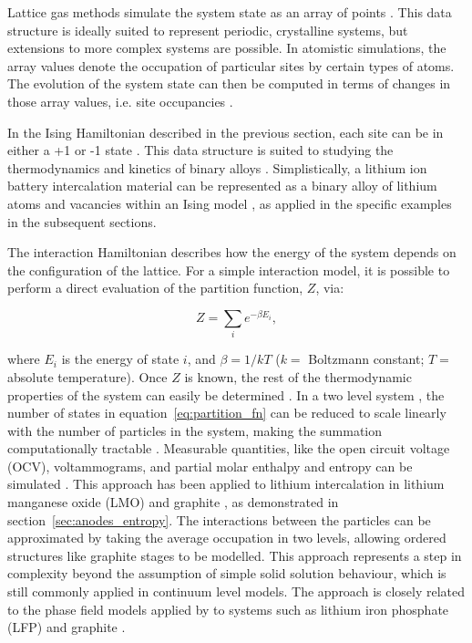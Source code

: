 \documentclass[../main.tex]{subfiles}
\begin{document}
Lattice gas methods simulate the system state as an array of points \cite{Binder2009book}. This data structure is ideally suited to represent periodic, crystalline systems, but extensions to more complex systems are possible. In atomistic simulations, the array values denote the occupation of particular sites by certain types of atoms. The evolution of the system state can then be computed in terms of changes in those array values, i.e. site occupancies \cite{Binder2009book}.
    
In the Ising Hamiltonian described in the previous section, each site can be in either a +1 or -1 state \cite{lee1952}. This data structure is suited to studying the thermodynamics and kinetics of binary alloys \cite{PMERCER2016394,oviedo2015underpotential}. Simplistically, a lithium ion battery intercalation material can be represented as a binary alloy of lithium atoms and vacancies within an Ising model \cite{persson2010,mercer_influence_2017,Kim2001ThermodynamicAK}, as applied in the specific examples in the subsequent sections.  
    
The interaction Hamiltonian describes how the energy of the system depends on the configuration of the lattice. For a simple interaction model, it is possible to perform a direct evaluation of the partition function, $Z$, via:
    
\begin{equation}
        Z = \sum_{i}e^{-\beta E_{i}},
        \label{eq:partition_fn}
\end{equation}

where $E_{i}$ is the energy of state $i$, and $\beta = 1/kT$ ($k =$ Boltzmann constant; $T=$ absolute temperature). Once $Z$ is known, the rest of the thermodynamic properties of the system can easily be determined \cite{Mercer2019,Leiva2017b,schlueter_quantifying_2018}. In a two level system \cite{Leiva2017b}, the number of states in equation~\ref{eq:partition_fn} can be reduced to scale linearly with the number of particles in the system, making the summation computationally tractable \cite{Mercer2019,Leiva2017b,schlueter_quantifying_2018}. Measurable quantities, like the open circuit voltage (OCV), voltammograms, and partial molar enthalpy and entropy can be simulated \cite{schlueter_quantifying_2018,Leiva2017b,Mercer2019}. This approach has been applied to lithium intercalation in lithium manganese oxide (LMO) \cite{schlueter_quantifying_2018} and graphite \cite{Mercer2019,Leiva2017b}, as demonstrated in section~\ref{sec:anodes_entropy}. The interactions between the particles can be approximated by taking the average occupation in two levels, allowing ordered structures like graphite stages to be modelled. This approach represents a step in complexity beyond the assumption of simple solid solution behaviour, which is still commonly applied in continuum level models. \citeauthor{HAFTBARADARAN2011361} The approach is closely related to the phase field models applied by \citeauthor{Bazant2017} to systems such as lithium iron phosphate (LFP) and graphite \cite{Bazant2017,guo2016,peng2011}.
\end{document}
